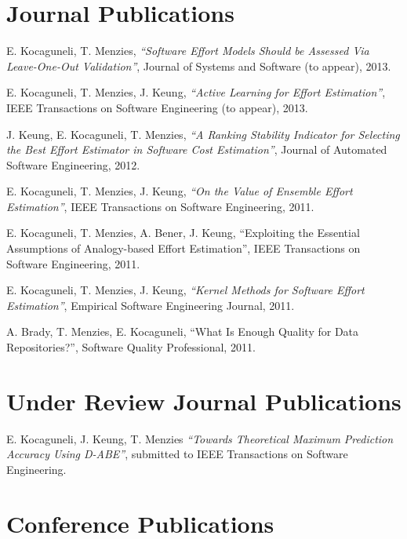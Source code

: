 \documentclass[margin]{res}
\begin{document}
\begin{resume}
\begin{list}{}{\leftmargin=0.5em}
\end{list}


\section{Journal Publications}

\begin{list}{}{\leftmargin=0.5em}
\item E. Kocaguneli, T. Menzies, \textit{``Software Effort Models Should be Assessed Via
Leave-One-Out Validation''}, Journal of Systems and Software (to appear), 2013.
\item E. Kocaguneli, T. Menzies, J. Keung, \textit{``Active Learning for Effort Estimation''}, IEEE Transactions on Software Engineering (to appear), 2013.
\item J. Keung, E. Kocaguneli, T. Menzies, \textit{``A Ranking Stability Indicator for Selecting the Best Effort Estimator in Software Cost Estimation''}, Journal of Automated Software Engineering, 2012.
\item E. Kocaguneli, T. Menzies, J. Keung, \textit{``On the Value of Ensemble Effort Estimation''},  IEEE Transactions on Software Engineering, 2011.
\item E. Kocaguneli, T. Menzies, A. Bener, J. Keung, ``Exploiting the Essential Assumptions of Analogy-based Effort Estimation'', IEEE Transactions on Software Engineering, 2011.
\item E. Kocaguneli, T. Menzies, J. Keung, \textit{``Kernel Methods for Software Effort Estimation''}, Empirical Software Engineering Journal, 2011. 
\item A. Brady, T. Menzies, E. Kocaguneli, ``What Is Enough Quality for Data Repositories?'',  Software Quality Professional, 2011.
\end{list}

\section{Under Review Journal Publications}

\begin{list}{}{\leftmargin=0.5em}
\item E. Kocaguneli, J. Keung, T. Menzies \textit{``Towards Theoretical Maximum Prediction Accuracy Using D-ABE''}, submitted to IEEE Transactions on Software Engineering.
\end{list}



\section{Conference Publications}


\end{resume}
\end{document}
